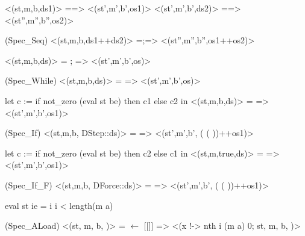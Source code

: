 \documentclass[12pt]{report}
\begin{document}
     <(st,m,b,ds1)> ==> <(st',m',b',os1)>
   <(st',m',b',ds2)> ==> <(st'',m'',b'',os2)>
\par
\noindent\hrulefill\par
\noindent{} (Spec\_Seq)
<(st,m,b,ds1++ds2)> =;=> <(st'',m'',b'',os1++os2)>


  <(st,m,b,ds)> =    ;      =>
  <(st',m',b',os)>
\par
\noindent\hrulefill\par
\noindent{} (Spec\_While)
<(st,m,b,ds)> =      => <(st',m',b',os)>






   let c := if not\_zero (eval st be) then c1 else c2 in
       <(st,m,b,ds)> =  => <(st',m',b',os1)>
\par
\noindent\hrulefill\par
\noindent{} (Spec\_If)
 <(st,m,b, DStep::ds)> =        =>
   <(st',m',b',  ( (  ))++os1)>


   let c := if not\_zero (eval st be) then c2 else c1 in
     <(st,m,true,ds)> =  => <(st',m',b',os1)>
\par
\noindent\hrulefill\par
\noindent{} (Spec\_If\_F)
<(st,m,b, DForce::ds)> =        =>
  <(st',m',b',  ( (  ))++os1)>




      eval st ie = i      i < length(m a)
\par
\noindent\hrulefill\par
\noindent{} (Spec\_ALoad)
 <(st, m, b, )> =  \ensuremath{\leftarrow} [[]] =>
 <(x !-> nth i (m a) 0; st, m, b,   )>
\end{document}
